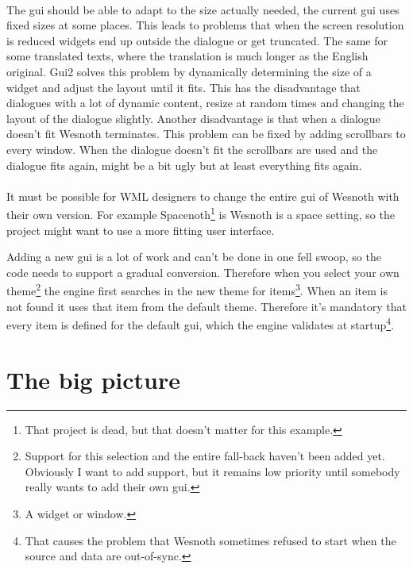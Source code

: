 \paragraph{}

The gui should be able to adapt to the size actually needed, the current gui
uses fixed sizes at some places. This leads to problems that when the screen
resolution is reduced widgets end up outside the dialogue or get truncated. The
same for some translated texts, where the translation is much longer as the
English original. Gui2 solves this problem by dynamically determining the size
of a widget and adjust the layout until it fits. This has the disadvantage that
dialogues with a lot of dynamic content, resize at random times and changing the
layout of the dialogue slightly. Another disadvantage is that when a dialogue
doesn't fit Wesnoth terminates. This problem can be fixed by adding scrollbars
to every window. When the dialogue doesn't fit the scrollbars are used and the
dialogue fits again, might be a bit ugly but at least everything fits again.

\paragraph{}

It must be possible for WML designers to change the entire gui of Wesnoth with
their own version. For example Spacenoth\footnote{That project is dead, but
that doesn't matter for this example.} is Wesnoth is a space setting, so the
project might want to use a more fitting user interface.

Adding a new gui is a lot of work and can't be done in one fell swoop, so the
code needs to support a gradual conversion. Therefore when you select your own
theme\footnote{Support for this selection and the entire fall-back haven't been
added yet. Obviously I want to add support, but it remains low priority until
somebody really wants to add their own gui.} the engine first searches in the
new theme for items\footnote{A widget or window.}. When an item is not found it
uses that item from the default theme. Therefore it's mandatory that every item
is defined for the default gui, which the engine validates at
startup\footnote{That causes the problem that Wesnoth sometimes refused to start
when the source and data are out-of-sync.}.

\section{The big picture}

